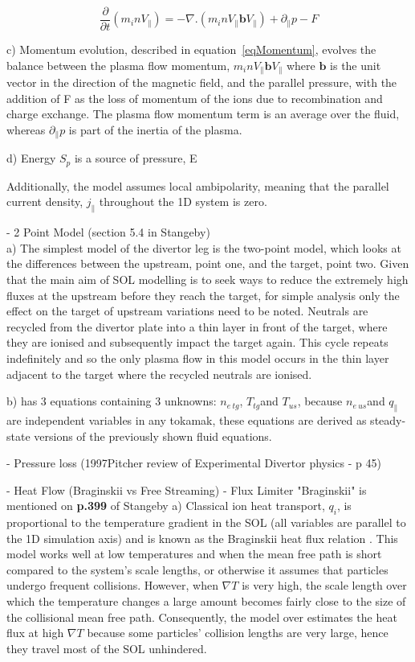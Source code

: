 \documentclass[11pt]{article}  %
\providecommand{\neus}{$n_{e~us}$} %
\providecommand{\netg}{$n_{e~tg}$} %
\providecommand{\Tus}{$T_{us}$} %
\providecommand{\Ttg}{$T_{tg}$} %
\newcommand{\citep}[1]{\cite{#1}}
\begin{document}
\begin{equation}\label{eqMomentum}
\frac{\partial}{\partial t}(m_i n V_{\parallel}) = -\nabla . (m_i n V_{\parallel} \textbf{b} V_{\parallel}) + \partial_{\parallel}p - F
\end{equation}

c) Momentum evolution, described in equation~\ref{eqMomentum}, evolves the balance between the plasma flow momentum, $m_inV_{\parallel}\textbf{b}V_{\parallel}$ where $\textbf{b}$ is the unit vector in the direction of the magnetic field, and the parallel pressure, with the addition of F as the loss of momentum of the ions due to recombination and charge exchange. The plasma flow momentum term is an average over the fluid, whereas $\partial_{\parallel}p$ is part of the inertia of the plasma.

d) Energy 
$S_p$ is a source of pressure, E


Additionally, the model assumes local ambipolarity, meaning that the parallel current density, $j_{\parallel}$ throughout the 1D system is zero. 

- 2 Point Model (section 5.4 in Stangeby)\\
a) The simplest model of the divertor leg is the two-point model, which looks at the differences between the upstream, point one, and the target, point two. Given that the main aim of SOL modelling is to seek ways to reduce the extremely high fluxes at the upstream before they reach the target, for simple analysis only the effect on the target of upstream variations need to be noted. Neutrals are recycled from the divertor plate into a thin layer in front of the target, where they are ionised and subsequently impact the target again. This cycle repeats indefinitely and so the only plasma flow in this model occurs in the thin layer adjacent to the target where the recycled neutrals are ionised.

b) has 3 equations containing 3 unknowns: \netg, \Ttg and \Tus, because \neus and $q_{\parallel}$ are independent variables in any tokamak, these equations are derived as steady-state versions of the previously shown fluid equations.


- Pressure loss (1997Pitcher review of Experimental Divertor physics - p 45)

- Heat Flow (Braginskii vs Free Streaming) - Flux Limiter
"Braginskii" is mentioned on \textbf{p.399} of Stangeby
a) Classical ion heat transport, $q_i$, is proportional to the temperature gradient in the SOL (all variables are parallel to the 1D simulation axis) and is known as the Braginskii heat flux relation \citep{Braginskii1965}. This model works well at low temperatures and when the mean free path is short compared to the system's scale lengths, or otherwise it assumes that particles undergo frequent collisions. However, when $\nabla T$ is very high, the scale length over which the temperature changes a large amount becomes fairly close to the size of the collisional mean free path. Consequently, the model over estimates the heat flux at high $\nabla T$ because some particles' collision lengths are very large, hence they travel most of the SOL unhindered.
\end{document}
